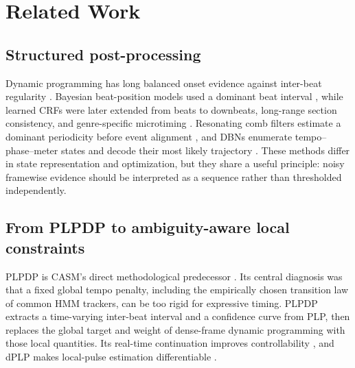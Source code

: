 \documentclass{article}
\begin{document}
\section{Related Work}
\label{sec:related}

\subsection{Structured post-processing}

Dynamic programming has long balanced onset evidence against inter-beat
regularity \cite{ellis2007beattracking}. Bayesian beat-position models used a
dominant beat interval \cite{korzeniowski2014crf}, while learned CRFs were later
extended from beats to downbeats, long-range section consistency, and
genre-specific microtiming \cite{fillon2015crf,durand2016crfdownbeat,
fuentes2019skipchain,fuentes2019microtiming}. Resonating comb filters estimate a
dominant periodicity before event alignment \cite{bock2015combfilter}, and DBNs
enumerate tempo--phase--meter states and decode their most likely trajectory
\cite{krebs2015dbn,bock2016joint}. These methods differ in state representation
and optimization, but they share a useful principle: noisy framewise evidence
should be interpreted as a sequence rather than thresholded independently.

\subsection{From PLPDP to ambiguity-aware local constraints}

PLPDP is CASM's direct methodological predecessor
\cite{chiu2023localperiodicity}. Its central diagnosis was that a fixed global
tempo penalty, including the empirically chosen transition law of common HMM
trackers, can be too rigid for expressive timing. PLPDP extracts a time-varying
inter-beat interval and a confidence curve from PLP, then replaces the global
target and weight of dense-frame dynamic programming with those local
quantities. Its real-time continuation improves controllability
\cite{meier2024realtime}, and dPLP makes local-pulse estimation differentiable
\cite{chiu2025dplp}.

\end{document}
